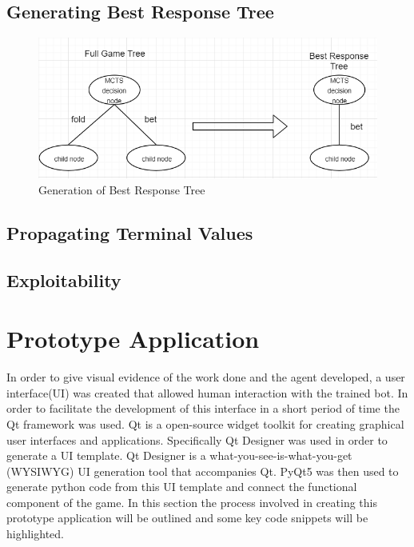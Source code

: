 \subsection{Generating Best Response Tree}\label{subsec:applyMCTS}

\begin{figure}[ht]
    \includegraphics[scale=1]{images/best_response_tree_vs_full_tree.PNG}
    \caption{Generation of Best Response Tree}
\end{figure}

\subsection{Propagating Terminal Values}\label{subsec:propagateTerminals}
\subsection{Exploitability}\label{subsec:exploitability}

\section{Prototype Application}\label{sec:prototypeApp}
In order to give visual evidence of the work done and the agent developed, a user interface(UI) was created
that allowed human interaction with the trained bot.
In order to facilitate the development of this interface in a short period of time the Qt framework was used.
Qt is a open-source widget toolkit for creating graphical user interfaces and applications.
Specifically Qt Designer was used in order to generate a UI template.
Qt Designer is a what-you-see-is-what-you-get (WYSIWYG) UI generation tool that accompanies Qt.
PyQt5 was then used to generate python code from this UI template and connect the functional component of the game.
In this section the process involved in creating this prototype application will be outlined
and some key code snippets will be highlighted.

